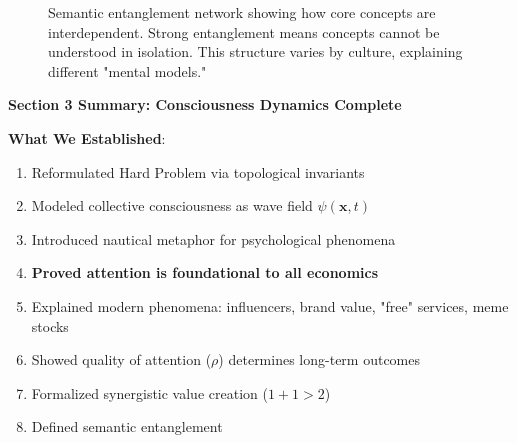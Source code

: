 \documentclass[11pt,a4paper]{article}
\theoremstyle{definition}
\theoremstyle{remark}
\begin{document}
\begin{small}
\begin{figure}[H]
\caption{Semantic entanglement network showing how core concepts are interdependent. Strong entanglement means concepts cannot be understood in isolation. This structure varies by culture, explaining different "mental models."}
\label{fig:semantic_entanglement}
\end{figure}

\begin{mdframed}[backgroundcolor=green!10,linewidth=2pt,linecolor=green!70!black]
\textbf{Section 3 Summary: Consciousness Dynamics Complete}

\textbf{What We Established}:
\begin{enumerate}[nosep]
    \item Reformulated Hard Problem via topological invariants
    \item Modeled collective consciousness as wave field \(\psi(\mathbf{x},t)\)
    \item Introduced nautical metaphor for psychological phenomena
    \item \textbf{Proved attention is foundational to all economics}
    \item Explained modern phenomena: influencers, brand value, "free" services, meme stocks
    \item Showed quality of attention (\(\rho\)) determines long-term outcomes
    \item Formalized synergistic value creation (\(1+1>2\)) 
    \item Defined semantic entanglement
\end{enumerate}


\end{mdframed}
\end{small}
\end{document}
